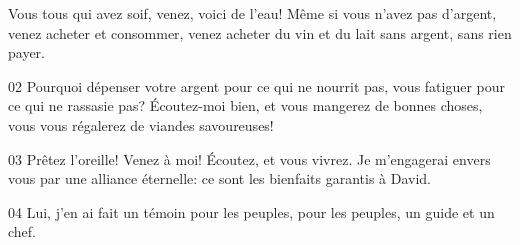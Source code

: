 Vous tous qui avez soif, venez, voici de l’eau! Même si vous n’avez pas d’argent, venez acheter et consommer, venez acheter du vin et du lait sans argent, sans rien payer.

02 Pourquoi dépenser votre argent pour ce qui ne nourrit pas, vous fatiguer pour ce qui ne rassasie pas? Écoutez-moi bien, et vous mangerez de bonnes choses, vous vous régalerez de viandes savoureuses!

03 Prêtez l’oreille! Venez à moi! Écoutez, et vous vivrez. Je m’engagerai envers vous par une alliance éternelle: ce sont les bienfaits garantis à David.

04 Lui, j’en ai fait un témoin pour les peuples, pour les peuples, un guide et un chef.